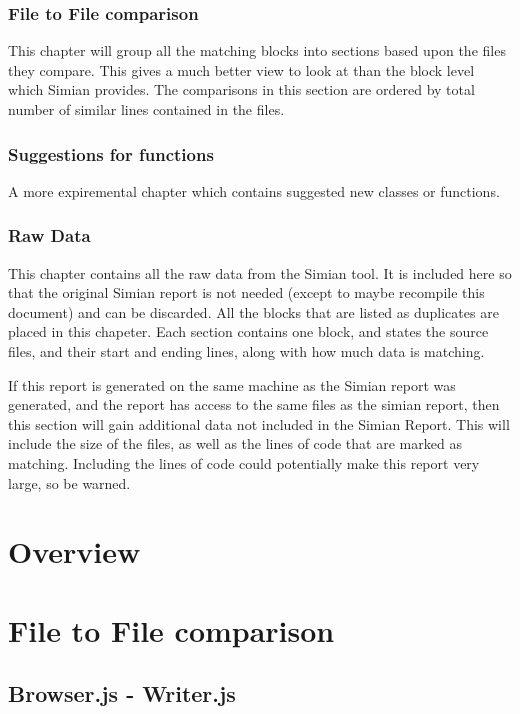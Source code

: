 \documentclass{report}[10pt]
\begin{document}
\subsection{File to File comparison}

This chapter will group all the matching blocks into sections based upon the files they compare. This gives a much better view to look at than the block level which Simian provides. The comparisons in this section are ordered by total number of similar lines contained in the files.

\subsection{Suggestions for functions}

A more expiremental chapter which contains suggested new classes or functions. 

\subsection{Raw Data}

This chapter contains all the raw data from the Simian tool. It is included here so that the original Simian report is not needed (except to maybe recompile this document) and can be discarded. All the blocks that are listed as duplicates are placed in this chapeter. Each section contains one block, and states the source files, and their start and ending lines, along with how much data is matching.

If this report is generated on the same machine as the Simian report was generated, and the report has access to the same files as the simian report, then this section will gain additional data not included in the Simian Report. This will include the size of the files, as well as the lines of code that are marked as matching. Including the lines of code could potentially make this report very large, so be warned.

\chapter{Overview}

\chapter{File to File comparison}

\section{Browser.js - Writer.js}
\end{document}
